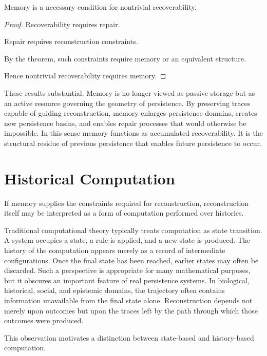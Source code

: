 \documentclass[12pt,oneside]{article}
\theoremstyle{definition}
\begin{document}
\begin{corollary}

Memory is a necessary condition for nontrivial recoverability.

\end{corollary}

\begin{proof}

Recoverability requires repair.

Repair requires reconstruction constraints.

By the theorem, such constraints require memory or an equivalent structure.

Hence nontrivial recoverability requires memory.

\end{proof}

These results substantial. Memory is no longer viewed as passive storage but as an active resource governing the geometry of persistence. By preserving traces capable of guiding reconstruction, memory enlarges persistence domains, creates new persistence basins, and enables repair processes that would otherwise be impossible. In this sense memory functions as accumulated recoverability. It is the structural residue of previous persistence that enables future persistence to occur.

\section{Historical Computation}

If memory supplies the constraints required for reconstruction, reconstruction itself may be interpreted as a form of computation performed over histories.

Traditional computational theory typically treats computation as state transition. A system occupies a state, a rule is applied, and a new state is produced. The history of the computation appears merely as a record of intermediate configurations. Once the final state has been reached, earlier states may often be discarded. Such a perspective is appropriate for many mathematical purposes, but it obscures an important feature of real persistence systems. In biological, historical, social, and epistemic domains, the trajectory often contains information unavailable from the final state alone. Reconstruction depends not merely upon outcomes but upon the traces left by the path through which those outcomes were produced.

This observation motivates a distinction between state-based and history-based computation.
\end{document}
